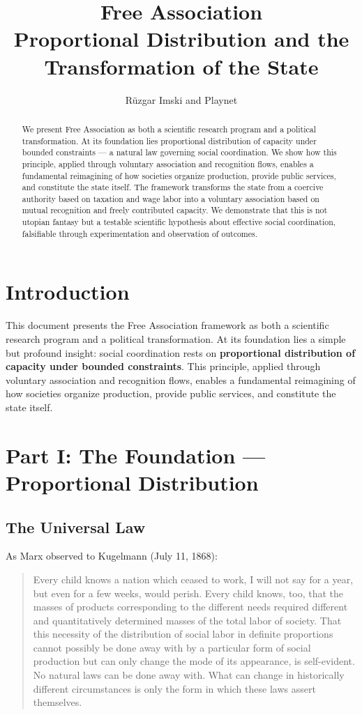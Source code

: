 \documentclass[11pt]{article}
\title{\textbf{Free Association}\\
\large Proportional Distribution and the Transformation of the State}
\author{Rüzgar Imski and Playnet}
\date{}
\begin{document}
\maketitle

\begin{abstract}
We present Free Association as both a scientific research program and a political transformation. At its foundation lies proportional distribution of capacity under bounded constraints — a natural law governing social coordination. We show how this principle, applied through voluntary association and recognition flows, enables a fundamental reimagining of how societies organize production, provide public services, and constitute the state itself. The framework transforms the state from a coercive authority based on taxation and wage labor into a voluntary association based on mutual recognition and freely contributed capacity. We demonstrate that this is not utopian fantasy but a testable scientific hypothesis about effective social coordination, falsifiable through experimentation and observation of outcomes.
\end{abstract}

\tableofcontents

\section{Introduction}

This document presents the Free Association framework as both a scientific research program and a political transformation. At its foundation lies a simple but profound insight: social coordination rests on \textbf{proportional distribution of capacity under bounded constraints}. This principle, applied through voluntary association and recognition flows, enables a fundamental reimagining of how societies organize production, provide public services, and constitute the state itself.

\section{Part I: The Foundation — Proportional Distribution}

\subsection{The Universal Law}

As Marx observed to Kugelmann (July 11, 1868):

\begin{quote}
Every child knows a nation which ceased to work, I will not say for a year, but even for a few weeks, would perish. Every child knows, too, that the masses of products corresponding to the different needs required different and quantitatively determined masses of the total labor of society. That this necessity of the distribution of social labor in definite proportions cannot possibly be done away with by a particular form of social production but can only change the mode of its appearance, is self-evident. No natural laws can be done away with. What can change in historically different circumstances is only the form in which these laws assert themselves.
\end{quote}
\end{document}
